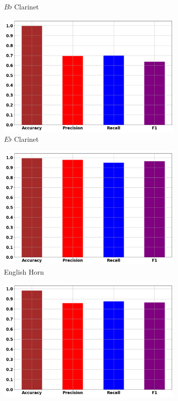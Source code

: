 \documentclass[12pt,letterpaper]{article}
\begin{document}
\begin{figure}[H]
\begin{subfigure}[b]{0.45\textwidth}
	\caption{$B\flat$ Clarinet}
	\end{subfigure}	
	\begin{subfigure}[b]{0.45\textwidth}
	\centering
	\includegraphics[width=\textwidth]{../FiguresClasses/EbClarinet}
	\caption{$E\flat$ Clarinet}
	\end{subfigure}	
	\begin{subfigure}[b]{0.45\textwidth}
	\centering
	\includegraphics[width=\textwidth]{../FiguresClasses/EnglishHorn}
	\caption{English Horn}
	\end{subfigure}	
	\begin{subfigure}[b]{0.45\textwidth}
	\centering
	\includegraphics[width=\textwidth]{../FiguresClasses/Flute}

\end{subfigure}
\end{figure}
\end{document}
